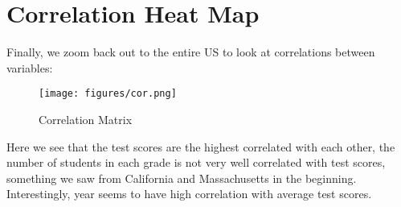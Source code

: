 \documentclass[
]{article}
\begin{document}
\section{Correlation Heat Map}
Finally, we zoom back out to the entire US to look at correlations between variables:
\begin{figure}[!ht]
	\centering
	\texttt{[image: figures/cor.png]}
	\caption{Correlation Matrix}
\end{figure} 
Here we see that the test scores are the highest correlated with each other, the number of students in each grade is not very well correlated with test scores, something we saw from California and Massachusetts in the beginning. Interestingly, year seems to have high correlation with average test scores.
\end{document}
